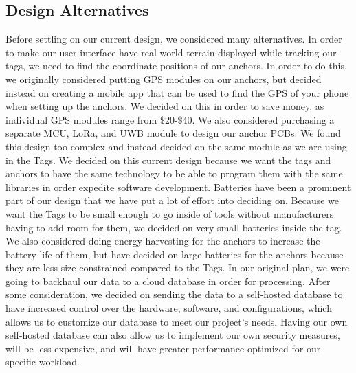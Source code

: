 \documentclass[conference]{IEEEtran}
\begin{document}
\subsection{Design Alternatives}
Before settling on our current design, we considered many alternatives. 
In order to make our user-interface have real world terrain displayed 
while tracking our tags, we need to find the coordinate positions of our 
anchors. In order to do this, we originally considered putting GPS modules 
on our anchors, but decided instead on creating a mobile app that can be 
used to find the GPS of your phone when setting up the anchors. We decided 
on this in order to save money, as individual GPS modules range from 
\$20-\$40. We also considered purchasing a separate MCU, LoRa, and UWB 
module to design our anchor PCBs. We found this design too complex and 
instead decided on the same module as we are using in the Tags. We decided 
on this current design because we want the tags and anchors to have the 
same technology to be able to program them with the same libraries in 
order expedite software development. Batteries have been a prominent 
part of our design that we have put a lot of effort into deciding on. 
Because we want the Tags to be small enough to go inside of tools without 
manufacturers having to add room for them, we decided on very small 
batteries inside the tag. We also considered doing energy harvesting 
for the anchors to increase the battery life of them, but have decided 
on large batteries for the anchors because they are less size constrained 
compared to the Tags. In our original plan, we were going to backhaul our 
data to a cloud database in order for processing. After some consideration, 
we decided on sending the data to a self-hosted database to have increased 
control over the hardware, software, and configurations, which allows us to 
customize our database to meet our project’s needs. Having our own 
self-hosted database can also allow us to implement our own security 
measures, will be less expensive, and will have greater performance 
optimized for our specific workload.
\end{document}
